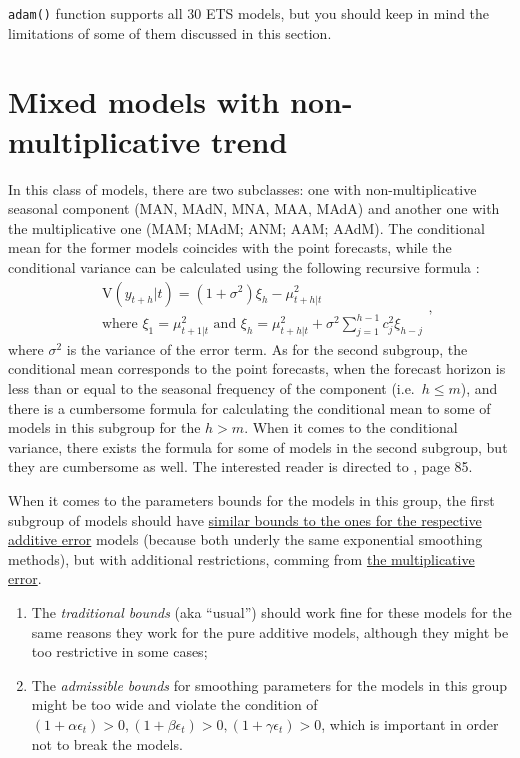 \documentclass[
]{book}
\providecommand{\tightlist}{%
  \setlength{\itemsep}{0pt}\setlength{\parskip}{0pt}}
\theoremstyle{definition}
\theoremstyle{definition}
\theoremstyle{definition}
\theoremstyle{definition}
\theoremstyle{remark}
\begin{document}
\texttt{adam()} function supports all 30 ETS models, but you should keep in mind the limitations of some of them discussed in this section.

\hypertarget{ADAMETSMixedModelsGroup3}{%
\section{Mixed models with non-multiplicative trend}\label{ADAMETSMixedModelsGroup3}}

In this class of models, there are two subclasses: one with non-multiplicative seasonal component (MAN, MAdN, MNA, MAA, MAdA) and another one with the multiplicative one (MAM; MAdM; ANM; AAM; AAdM). The conditional mean for the former models coincides with the point forecasts, while the conditional variance can be calculated using the following recursive formula \citep{Hyndman2008b}:
\begin{equation}
    \begin{aligned}
    & \text{V}(y_{t+h}|t) = (1+\sigma^2) \xi_h - \mu_{t+h|t}^2 \\
    & \text{where } \xi_{1} = \mu_{t+1|t}^2 \text{ and } \xi_h = \mu_{t+h|t}^2 + \sigma^2 \sum_{j=1}^{h-1} c_{j}^2 \xi_{h-j}
    \end{aligned} ,
    \label{eq:ETSADAMMixedModels31Variance}
\end{equation}
where \(\sigma^2\) is the variance of the error term. As for the second subgroup, the conditional mean corresponds to the point forecasts, when the forecast horizon is less than or equal to the seasonal frequency of the component (i.e.~\(h\leq m\)), and there is a cumbersome formula for calculating the conditional mean to some of models in this subgroup for the \(h>m\). When it comes to the conditional variance, there exists the formula for some of models in the second subgroup, but they are cumbersome as well. The interested reader is directed to \citet{Hyndman2008b}, page 85.

When it comes to the parameters bounds for the models in this group, the first subgroup of models should have \protect\hyperlink{stabilityConditionAdditiveError}{similar bounds to the ones for the respective additive error} models (because both underly the same exponential smoothing methods), but with additional restrictions, comming from \protect\hyperlink{stabilityConditionMultiplicativeError}{the multiplicative error}.

\begin{enumerate}
\def\labelenumi{\arabic{enumi}.}
\tightlist
\item
  The \emph{traditional bounds} (aka ``usual'') should work fine for these models for the same reasons they work for the pure additive models, although they might be too restrictive in some cases;
\item
  The \emph{admissible bounds} for smoothing parameters for the models in this group might be too wide and violate the condition of \((1+ \alpha \epsilon_t)>0, (1+ \beta \epsilon_t)>0, (1+ \gamma \epsilon_t)>0\), which is important in order not to break the models.
\end{enumerate}
\end{document}
